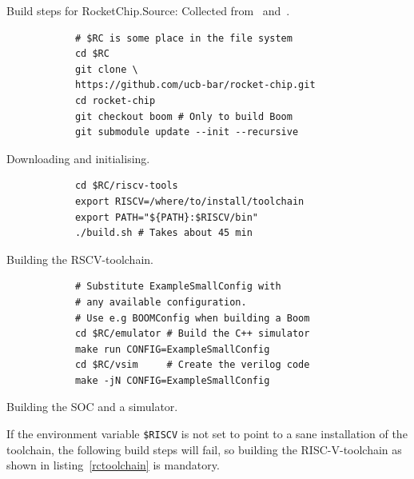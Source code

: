 \documentclass[journal,a4paper]{IEEEtran}
\begin{document}

\begin{table}
	\caption{Build steps for RocketChip.\newline\hspace{\linewidth}Source: Collected from~\cite{rc-github} and~\cite{boom-github}.}
		\label{rcclone}
	\begin{subtable}[b]{0.9\linewidth}
		\begin{verbatim}
			# $RC is some place in the file system
			cd $RC
			git clone \
			https://github.com/ucb-bar/rocket-chip.git
			cd rocket-chip
			git checkout boom # Only to build Boom
			git submodule update --init --recursive
		\end{verbatim}
		\caption{Downloading and initialising.}
	\end{subtable}
	\begin{subtable}[b]{0.9\linewidth}
		\begin{verbatim}
			cd $RC/riscv-tools
			export RISCV=/where/to/install/toolchain
			export PATH="${PATH}:$RISCV/bin"
			./build.sh # Takes about 45 min
		\end{verbatim}
		\caption{Building the RSCV-toolchain.}
		\label{rctoolchain}
	\end{subtable}
	\begin{subtable}[b]{0.9\linewidth}
		\begin{verbatim}
			# Substitute ExampleSmallConfig with
			# any available configuration.
			# Use e.g BOOMConfig when building a Boom
			cd $RC/emulator # Build the C++ simulator
			make run CONFIG=ExampleSmallConfig
			cd $RC/vsim     # Create the verilog code
			make -jN CONFIG=ExampleSmallConfig
		\end{verbatim}
		\caption{Building the SOC and a simulator.}
		\label{rcmake}
	\end{subtable}
\end{table}

If the environment variable \texttt{\$RISCV} is not set to point to a sane installation of the toolchain, the following build steps will fail, so building the RISC-V-toolchain as shown in listing~\ref{rctoolchain} is mandatory.
\end{document}

